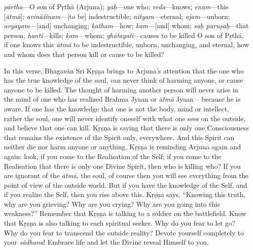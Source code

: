 {%
  \textit{pārtha}---O son of Pṛthā (Arjuna); 
  \textit{yaḥ}---one who; 
  \textit{veda}---knows; 
  \textit{enam}---this [\textit{ātmā}]; 
  \textit{avināśinam}---[to be] indestructible; 
  \textit{nityam}---eternal; 
  \textit{ajam}---unborn; 
  \textit{avyayam}---[and] unchanging; 
  \textit{katham}---how; 
  \textit{kam}---[and] whom; 
  \textit{saḥ puruṣaḥ}---that person; 
  \textit{hanti}---kills; 
  \textit{kam}---whom; 
  \textit{ghātayati}---causes to be killed
}
{%
  O son of Pṛthā, if one knows this \textit{ātmā} to be indestructible, unborn, unchanging, and eternal, how and whom does that person kill or cause to be killed?
}

In this verse, Bhagavān Sri Kṛṣṇa brings to Arjuna’s attention that the one who has the true knowledge of the soul, can never think of harming anyone, or cause anyone to be killed. The thought of harming another person will never arise in the mind of one who has realized Brahma Jyaan or \textit{ātmā} Jyaan -- because he is aware. If one has the knowledge that one is not the body, mind or intellect, rather the soul, one will never identify oneself with what one sees on the outside, and believe that one can kill. Kṛṣṇa is saying that there is only one Consciousness that remains the existence of the Spirit only, everywhere. And this Spirit can neither die nor harm anyone or anything. Kṛṣṇa is reminding Arjuna again and again: look, if you come to the Realisation of the Self; if you come to the Realisation that there is only one Divine Spirit, then who is killing who? If you are ignorant of the \textit{ātmā}, the soul, of course then you will see everything from the point of view of the outside world. But if you have the knowledge of the Self, and if you realize the Self, then you rise above this. Kṛṣṇa says, “Knowing this truth, why are you grieving? Why are you crying? Why are you going into this weakness?” Remember that Kṛṣṇa is talking to a soldier on the battlefield. Know that Kṛṣṇa is also talking to each spiritual seeker. Why do you fear to let go? Why do you fear to transcend the outside reality? Devote yourself completely to your \textit{sādhana}! Embrace life and let the Divine reveal Himself to you.

